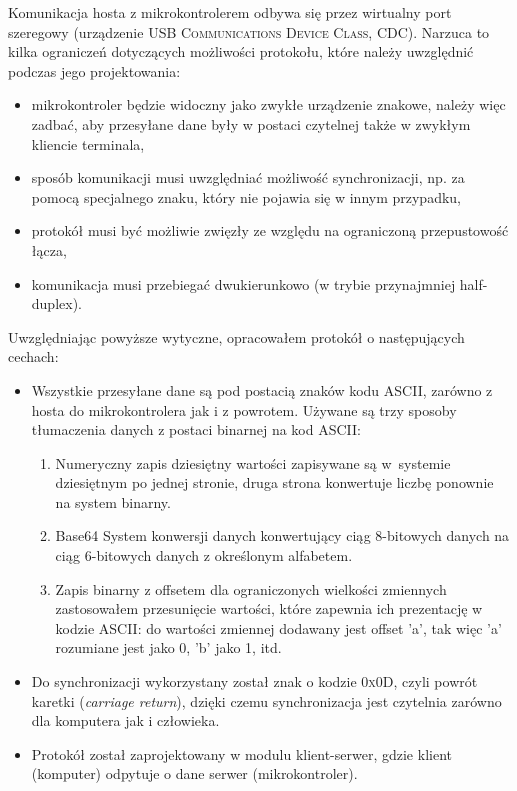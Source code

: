 Komunikacja hosta z mikrokontrolerem odbywa się przez wirtualny port szeregowy (urządzenie \textsc{USB Communications Device Class, CDC}). Narzuca to kilka ograniczeń dotyczących możliwości protokołu, które należy uwzględnić podczas jego projektowania:
\begin{itemize}
 \item mikrokontroler będzie widoczny jako zwykłe urządzenie znakowe, należy więc zadbać, aby przesyłane dane były w postaci czytelnej także w zwykłym kliencie terminala,
 \item sposób komunikacji musi uwzględniać możliwość synchronizacji, np. za pomocą specjalnego znaku, który nie pojawia się w innym przypadku,
 \item protokół musi być możliwie zwięzły ze względu na ograniczoną przepustowość łącza,
 \item komunikacja musi przebiegać dwukierunkowo (w trybie przynajmniej half-duplex).\\
\end{itemize}

Uwzględniając powyższe wytyczne, opracowałem protokół o następujących cechach:
\begin{itemize}
 \item Wszystkie przesyłane dane są pod postacią znaków kodu ASCII, zarówno z hosta do mikrokontrolera jak i z powrotem. Używane są trzy sposoby tłumaczenia danych z postaci binarnej na kod ASCII:
 \begin{enumerate}
  \item Numeryczny zapis dziesiętny \pauza wartości zapisywane są w~systemie dziesiętnym po jednej stronie, druga strona konwertuje liczbę ponownie na system binarny.
  \item Base64 \pauza System konwersji danych konwertujący ciąg 8-bitowych danych na ciąg 6-bitowych danych z określonym alfabetem.
  \item Zapis binarny z offsetem \pauza dla ograniczonych wielkości zmiennych zastosowałem przesunięcie wartości, które zapewnia ich prezentację w kodzie ASCII: do wartości zmiennej dodawany jest offset 'a', tak więc 'a' rozumiane jest jako 0, 'b' jako 1, itd.
 \end{enumerate}
 \item Do synchronizacji wykorzystany został znak o kodzie \textsc{0x0D}, czyli powrót karetki (\textit{carriage return}), dzięki czemu synchronizacja jest czytelnia zarówno dla komputera jak i człowieka.
 \item Protokół został zaprojektowany w modulu klient-serwer, gdzie klient (komputer) odpytuje o dane serwer (mikrokontroler).\\
\end{itemize}

